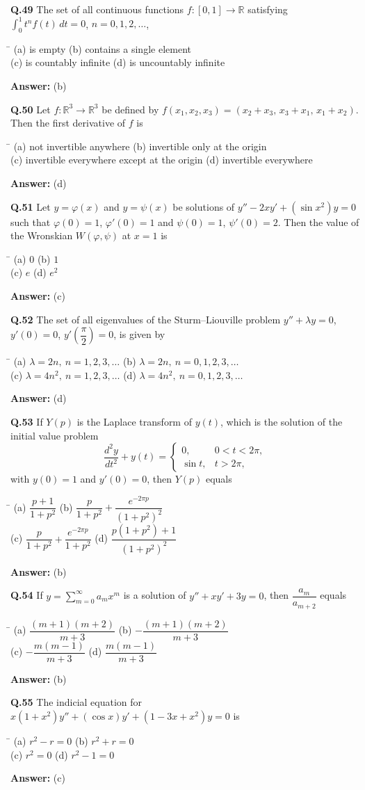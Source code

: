 \documentclass[11pt,a4paper]{article}
\newcommand{\optsfour}[4]{%
  \begin{tabbing}
    \hspace{0.48\linewidth}\=\kill
    (a) #1 \> (b) #2 \\[2pt]
    (c) #3 \> (d) #4
  \end{tabbing}%
}
\newcommand{\ans}[1]{\textbf{Answer:} #1\par\medskip}
\begin{document}
\textbf{Q.49} The set of all continuous functions $f : [0,1] \to \mathbb{R}$ satisfying $\displaystyle\int_0^1 t^n f(t)\,dt = 0$, $n = 0, 1, 2, \dots$,
\optsfour{is empty}{contains a single element}{is countably infinite}{is uncountably infinite}
\ans{(b)}

\textbf{Q.50} Let $f : \mathbb{R}^3 \to \mathbb{R}^3$ be defined by $f(x_1, x_2, x_3) = (x_2 + x_3,\, x_3 + x_1,\, x_1 + x_2)$. Then the first derivative of $f$ is
\optsfour{not invertible anywhere}{invertible only at the origin}{invertible everywhere except at the origin}{invertible everywhere}
\ans{(d)}

\textbf{Q.51} Let $y = \varphi(x)$ and $y = \psi(x)$ be solutions of $y'' - 2xy' + (\sin x^2)y = 0$ such that $\varphi(0) = 1$, $\varphi'(0) = 1$ and $\psi(0) = 1$, $\psi'(0) = 2$. Then the value of the Wronskian $W(\varphi, \psi)$ at $x = 1$ is
\optsfour{$0$}{$1$}{$e$}{$e^2$}
\ans{(c)}

\textbf{Q.52} The set of all eigenvalues of the Sturm--Liouville problem $y'' + \lambda y = 0$, $y'(0) = 0$, $y'\!\left(\dfrac{\pi}{2}\right) = 0$, is given by
\optsfour{$\lambda = 2n,\ n = 1, 2, 3, \dots$}{$\lambda = 2n,\ n = 0, 1, 2, 3, \dots$}{$\lambda = 4n^2,\ n = 1, 2, 3, \dots$}{$\lambda = 4n^2,\ n = 0, 1, 2, 3, \dots$}
\ans{(d)}

\textbf{Q.53} If $Y(p)$ is the Laplace transform of $y(t)$, which is the solution of the initial value problem
\[
  \frac{d^2y}{dt^2} + y(t) = \begin{cases} 0, & 0 < t < 2\pi, \\ \sin t, & t > 2\pi, \end{cases}
\]
with $y(0) = 1$ and $y'(0) = 0$, then $Y(p)$ equals
\optsfour{$\dfrac{p + 1}{1 + p^2}$}{$\dfrac{p}{1 + p^2} + \dfrac{e^{-2\pi p}}{(1 + p^2)^2}$}{$\dfrac{p}{1 + p^2} + \dfrac{e^{-2\pi p}}{1 + p^2}$}{$\dfrac{p(1 + p^2) + 1}{(1 + p^2)^2}$}
\ans{(b)}

\textbf{Q.54} If $y = \displaystyle\sum_{m=0}^{\infty} a_m x^m$ is a solution of $y'' + xy' + 3y = 0$, then $\dfrac{a_m}{a_{m+2}}$ equals
\optsfour{$\dfrac{(m+1)(m+2)}{m+3}$}{$-\dfrac{(m+1)(m+2)}{m+3}$}{$-\dfrac{m(m-1)}{m+3}$}{$\dfrac{m(m-1)}{m+3}$}
\ans{(b)}

\textbf{Q.55} The indicial equation for $x(1 + x^2)y'' + (\cos x)y' + (1 - 3x + x^2)y = 0$ is
\optsfour{$r^2 - r = 0$}{$r^2 + r = 0$}{$r^2 = 0$}{$r^2 - 1 = 0$}
\ans{(c)}
\end{document}
